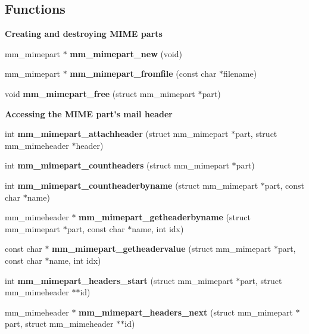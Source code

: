 \subsection*{Functions}
\begin{Indent}{\bf Creating and destroying MIME parts}\par
\begin{CompactItemize}
\item 
mm\_\-mimepart $\ast$ {\bf mm\_\-mimepart\_\-new} (void)
\item 
mm\_\-mimepart $\ast$ {\bf mm\_\-mimepart\_\-fromfile} (const char $\ast$filename)
\item 
void {\bf mm\_\-mimepart\_\-free} (struct mm\_\-mimepart $\ast$part)
\end{CompactItemize}
\end{Indent}
\begin{Indent}{\bf Accessing the MIME part's mail header}\par
\begin{CompactItemize}
\item 
int {\bf mm\_\-mimepart\_\-attachheader} (struct mm\_\-mimepart $\ast$part, struct mm\_\-mimeheader $\ast$header)
\item 
int {\bf mm\_\-mimepart\_\-countheaders} (struct mm\_\-mimepart $\ast$part)
\item 
int {\bf mm\_\-mimepart\_\-countheaderbyname} (struct mm\_\-mimepart $\ast$part, const char $\ast$name)
\item 
mm\_\-mimeheader $\ast$ {\bf mm\_\-mimepart\_\-getheaderbyname} (struct mm\_\-mimepart $\ast$part, const char $\ast$name, int idx)
\item 
const char $\ast$ {\bf mm\_\-mimepart\_\-getheadervalue} (struct mm\_\-mimepart $\ast$part, const char $\ast$name, int idx)
\item 
int {\bf mm\_\-mimepart\_\-headers\_\-start} (struct mm\_\-mimepart $\ast$part, struct mm\_\-mimeheader $\ast$$\ast$id)
\item 
mm\_\-mimeheader $\ast$ {\bf mm\_\-mimepart\_\-headers\_\-next} (struct mm\_\-mimepart $\ast$part, struct mm\_\-mimeheader $\ast$$\ast$id)
\end{CompactItemize}
\end{Indent}

